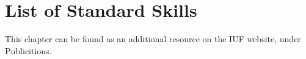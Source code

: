 \chapter{List of Standard Skills \label{chap:freestyle_std-skills-list}}
This chapter can be found as an additional resource on the IUF website, under Publicitions.
